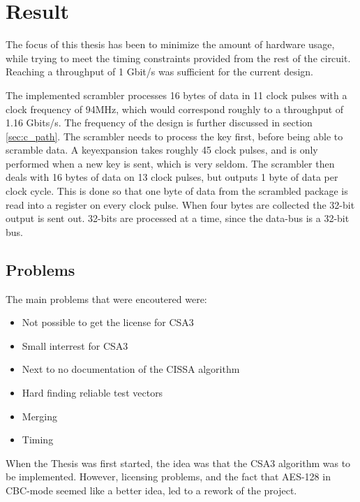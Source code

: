 \chapter{Result}
The focus of this thesis has been to minimize the amount of hardware 
usage, while trying to meet the timing constraints provided 
from the rest of the circuit. Reaching a throughput of 1 Gbit/s was 
sufficient for the current design.

The implemented scrambler processes 16 bytes of data in 11 clock pulses 
with a clock frequency of 94MHz, which would correspond roughly to a 
throughput of 1.16 Gbits/s. %
The frequency of the design is further discussed in section 
\ref{sec:c_path}. The scrambler needs to process the key first, before 
being able to scramble data. A keyexpansion takes roughly 45 clock 
pulses, and is only performed when a new key is sent, which is very 
seldom. The scrambler then deals with 16 bytes of data on 13 clock 
pulses, but outputs 1 byte of data per clock cycle. This is done so 
that one byte of data from the scrambled package is read into a 
register on every clock pulse. When four bytes are collected the 32-bit 
output is sent out. 32-bits are processed at a time, since the data-bus 
is a 32-bit bus.

\section{Problems}
The main problems that were encoutered were:

\begin{itemize}
\item Not possible to get the license for CSA3
\item Small interrest for CSA3
\item Next to no documentation of the CISSA algorithm
\item Hard finding reliable test vectors
\item Merging
\item Timing
\end{itemize}

When the Thesis was first started, the idea was that the CSA3 algorithm 
was to be implemented. However, licensing problems, and the fact that 
AES-128 in CBC-mode seemed like a better idea, led to a rework of the 
project.

